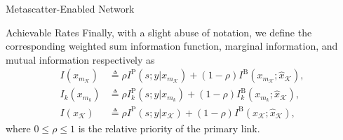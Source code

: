 \documentclass[journal]{IEEEtran}
\begin{document}
\begin{section}{Metascatter-Enabled Network}
\begin{subsection}{Achievable Rates}
		Finally, with a slight abuse of notation, we define the corresponding weighted sum information function, marginal information, and mutual information respectively as
		\begin{align}
			I(x_{m_{\mathcal{K}}})
			 & \triangleq \rho I^{\mathrm{P}}(s;y|x_{m_{\mathcal{K}}}) + (1 - \rho) I^{\mathrm{B}}(x_{m_{\mathcal{K}}};\hat{x}_{\mathcal{K}}),\label{eq:weighted_sum_information_function} \\
			I_k(x_{m_k})
			 & \triangleq \rho I^{\mathrm{P}}_{k}(s;y|x_{m_k}) + (1 - \rho) I^{\mathrm{B}}_{k}(x_{m_k};\hat{x}_{\mathcal{K}}),\label{eq:weighted_sum_marginal_information}                 \\
			I(x_{\mathcal{K}})
			 & \triangleq \rho I^{\mathrm{P}}(s;y|x_{\mathcal{K}}) + (1 - \rho) I^{\mathrm{B}}(x_{\mathcal{K}};\hat{x}_{\mathcal{K}}),\label{eq:weighted_sum_mutual_information}
		\end{align}
		where $0 \le \rho \le 1$ is the relative priority of the primary link.


	\end{subsection}
\end{section}
\end{document}
